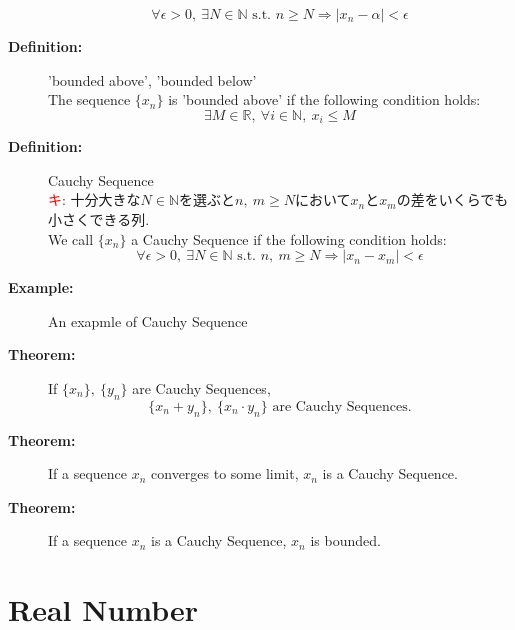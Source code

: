 \documentclass[english,dvipdfmx]{jsarticle}
\newcommand*{\point}{\textcircled{\textcolor{red}{\scriptsize キ}}}
\begin{document}
\begin{description}
            \begin{equation*}
                \forall \epsilon > 0 ,\ \exists N \in \mathbb{N} \text{ s.t. } n \geq N \Rightarrow | x_n - \alpha | < \epsilon
            \end{equation*}
        \item[\bf{Definition:}] 'bounded above', 'bounded below' \\
            The sequence $\{ x_n \}$ is 'bounded above' if the following condition holds:
            \begin{equation*}
                \exists M \in \mathbb{R},\ \forall i \in \mathbb{N},\ x_i \leq M
            \end{equation*}

        \item[\bf{Definition:}] Cauchy Sequence \\
            \point : 十分大きな$N \in \mathbb{N}$を選ぶと$n,\ m \geq N$において$x_n$と$x_m$の差をいくらでも小さくできる列. \\
            We call $\{ x_n \}$ a Cauchy Sequence if the following condition holds: 
            \begin{equation*}
                \forall \epsilon > 0,\ \exists N \in \mathbb{N} \text{ s.t. } n,\ m \geq N \Rightarrow | x_n - x_m | < \epsilon
            \end{equation*}
        \item[\bf{Example:}] An exapmle of Cauchy Sequence \\
        \item[\bf{Theorem:}] If $\{ x_n \} ,\ \{ y_n \}$ are Cauchy Sequences, 
            \begin{equation*}
                \{ x_n + y_n \} ,\ \{ x_n \cdot y_n \} \text{ are Cauchy Sequences.} 
            \end{equation*}
        \item[\bf{Theorem:}] If a sequence $x_n$ converges to some limit, $x_n$ is a Cauchy Sequence.
        \item[\bf{Theorem:}] If a sequence $x_n$ is a Cauchy Sequence, $x_n$ is bounded.
    \end{description}

\newpage
\section{Real Number}
\end{document}

